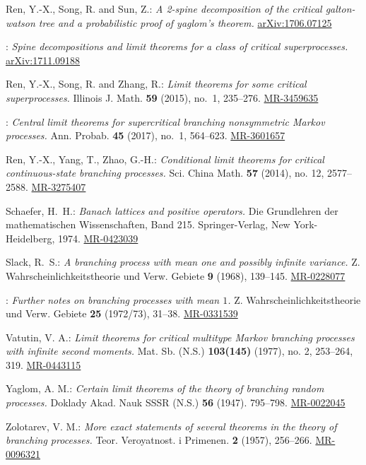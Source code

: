 \documentclass[12pt, a4paper]{amsart}
\def\MR#1{\href{http://www.ams.org/mathscinet-getitem?mr=#1}{MR-#1}}
\def\ARXIV#1{\href{https://arxiv.org/abs/#1}{arXiv:#1}}
\theoremstyle{definition}
\numberwithin{equation}{section}
\begin{document}
\begin{thebibliography}{10}
	Ren, Y.-X., Song, R. and Sun, Z.: 
	\emph{A 2-spine decomposition of the critical galton-watson tree and a probabilistic proof of yaglom's theorem.} 
	\ARXIV{1706.07125}
	
	\bysame: 
	\emph{Spine decompositions and limit theorems for a class of critical superprocesses.} 
	\ARXIV{1711.09188}
	
	Ren, Y.-X., Song, R. and Zhang, R.: 
	\emph{Limit theorems for some critical superprocesses.} 
	Illinois J. Math. \textbf{59} (2015), no.~1, 235--276.
	\MR{3459635}
	
	\bysame: 
	\emph{Central limit theorems for supercritical branching nonsymmetric {M}arkov processes.} 
	Ann. Probab. \textbf{45} (2017), no.~1, 564--623.
	\MR{3601657}
	
	Ren, Y.-X., Yang, T., Zhao, G.-H.:
	\emph{Conditional limit theorems for critical continuous-state branching processes.}
	Sci. China Math. \textbf{57} (2014), no. 12, 2577–2588. 
	\MR{3275407}
	
	Schaefer, H.~H.:
	\emph{Banach lattices and positive operators.}
	Die Grundlehren der mathematischen Wissenschaften, Band 215. Springer-Verlag, New York-Heidelberg, 1974.
	\MR{0423039}
	
	Slack, R.~S.:
	\emph{A branching process with mean one and possibly infinite variance.}
	Z. Wahrscheinlichkeitstheorie und Verw. Gebiete \textbf{9} (1968), 139--145. 
	\MR{0228077}
	
	\bysame: \emph{Further notes on branching processes with mean {$1$}.} 
	Z. Wahrscheinlichkeitstheorie und Verw. Gebiete \textbf{25} (1972/73), 31–38.
	\MR{0331539}
	
	Vatutin, V. A.:
	\emph{Limit theorems for critical multitype Markov branching processes with infinite second moments.} 
	Mat. Sb. (N.S.) \textbf{103(145)} (1977), no. 2, 253–264, 319.
	\MR{0443115} 
	
	Yaglom, A. M.:
	\emph{Certain limit theorems of the theory of branching random processes.}
	Doklady Akad. Nauk SSSR (N.S.) \textbf{56} (1947). 795–798. 
	\MR{0022045}
	
	Zolotarev, V. M.:
	\emph{More exact statements of several theorems in the theory of branching processes.}
	Teor. Veroyatnost. i Primenen. \textbf{2} (1957), 256–266.
	\MR{0096321}
	
\end{thebibliography}
\end{document}
